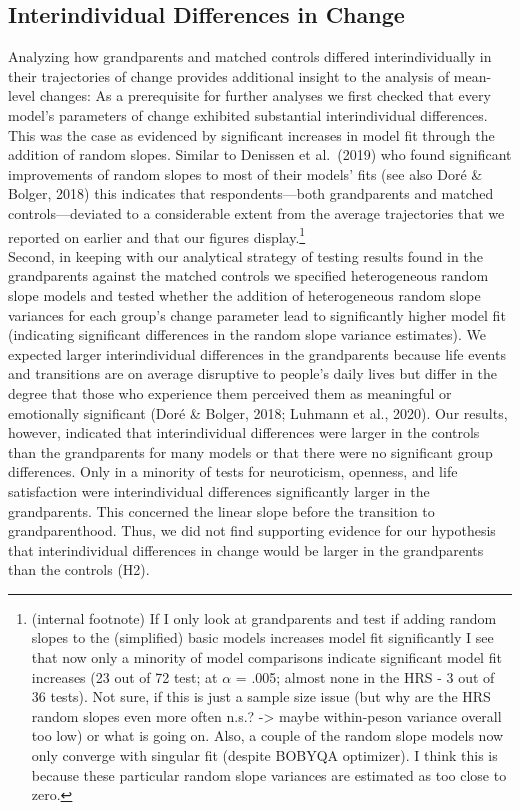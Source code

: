 \documentclass[
  english,
  man, noextraspace]{apa7}
\begin{document}
\hypertarget{interindividual-differences-in-change-1}{%
\subsection{Interindividual Differences in Change}\label{interindividual-differences-in-change-1}}

Analyzing how grandparents and matched controls differed interindividually in their trajectories of change provides additional insight to the analysis of mean-level changes: As a prerequisite for further analyses we first checked that every model's parameters of change exhibited substantial interindividual differences. This was the case as evidenced by significant increases in model fit through the addition of random slopes. Similar to Denissen et al.~(2019) who found significant improvements of random slopes to most of their models' fits (see also Doré \& Bolger, 2018) this indicates that respondents---both grandparents and matched controls---deviated to a considerable extent from the average trajectories that we reported on earlier and that our figures display.\footnote{(internal footnote) If I only look at grandparents and test if adding random slopes to the (simplified) basic models increases model fit significantly I see that now only a minority of model comparisons indicate significant model fit increases (23 out of 72 test; at \(\alpha\) = .005; almost none in the HRS - 3 out of 36 tests). Not sure, if this is just a sample size issue (but why are the HRS random slopes even more often n.s.? -\textgreater{} maybe within-peson variance overall too low) or what is going on. Also, a couple of the random slope models now only converge with singular fit (despite BOBYQA optimizer). I think this is because these particular random slope variances are estimated as too close to zero.}\\
Second, in keeping with our analytical strategy of testing results found in the grandparents against the matched controls we specified heterogeneous random slope models and tested whether the addition of heterogeneous random slope variances for each group's change parameter lead to significantly higher model fit (indicating significant differences in the random slope variance estimates). We expected larger interindividual differences in the grandparents because life events and transitions are on average disruptive to people's daily lives but differ in the degree that those who experience them perceived them as meaningful or emotionally significant (Doré \& Bolger, 2018; Luhmann et al., 2020). Our results, however, indicated that interindividual differences were larger in the controls than the grandparents for many models or that there were no significant group differences. Only in a minority of tests for neuroticism, openness, and life satisfaction were interindividual differences significantly larger in the grandparents. This concerned the linear slope before the transition to grandparenthood. Thus, we did not find supporting evidence for our hypothesis that interindividual differences in change would be larger in the grandparents than the controls (H2).\\
\end{document}
